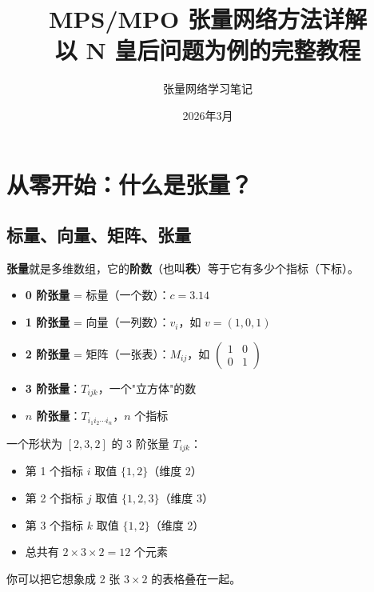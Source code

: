 \documentclass[12pt,a4paper]{article}
\title{\Huge\textbf{MPS/MPO 张量网络方法详解} \\ \Large 以 N 皇后问题为例的完整教程}
\author{张量网络学习笔记}
\date{2026年3月}
\begin{document}
\maketitle
\tableofcontents
\newpage

\section{从零开始：什么是张量？}

\subsection{标量、向量、矩阵、张量}

\begin{keybox}
\textbf{张量}就是多维数组，它的\textbf{阶数}（也叫\textbf{秩}）等于它有多少个指标（下标）。
\begin{itemize}
  \item \textbf{0 阶张量} = 标量（一个数）：$c = 3.14$
  \item \textbf{1 阶张量} = 向量（一列数）：$v_i$，如 $v = (1, 0, 1)$
  \item \textbf{2 阶张量} = 矩阵（一张表）：$M_{ij}$，如 $\begin{pmatrix} 1 & 0 \\ 0 & 1 \end{pmatrix}$
  \item \textbf{3 阶张量}：$T_{ijk}$，一个"立方体"的数
  \item \textbf{$n$ 阶张量}：$T_{i_1 i_2 \cdots i_n}$，$n$ 个指标
\end{itemize}
\end{keybox}

\begin{exbox}[例子：3 阶张量]
一个形状为 $[2,3,2]$ 的 3 阶张量 $T_{ijk}$：
\begin{itemize}
  \item 第 1 个指标 $i$ 取值 $\{1,2\}$（维度 2）
  \item 第 2 个指标 $j$ 取值 $\{1,2,3\}$（维度 3）
  \item 第 3 个指标 $k$ 取值 $\{1,2\}$（维度 2）
  \item 总共有 $2 \times 3 \times 2 = 12$ 个元素
\end{itemize}
你可以把它想象成 2 张 $3 \times 2$ 的表格叠在一起。
\end{exbox}
\end{document}
